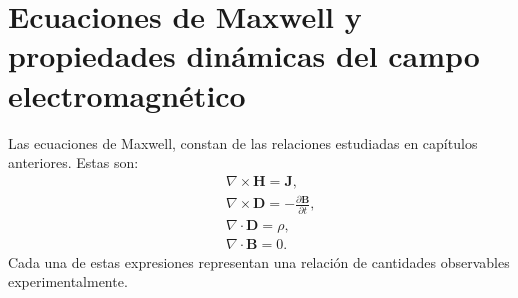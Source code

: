 \documentclass[11pt,fleqn]{book} %
\begin{document}

\pagestyle{empty} %
\tableofcontents %
\cleardoublepage %

\pagestyle{fancy} %


\chapter{Ecuaciones de Maxwell y propiedades din\'amicas del campo electromagn\'etico}

Las ecuaciones de Maxwell, constan de las relaciones estudiadas en cap\'itulos anteriores. Estas son:
\begin{eqnarray}
&&\nabla \times \textbf{H}=\textbf{J}, \nonumber\\
&&\nabla \times \textbf{D}=-\frac{\partial \textbf{B}}{\partial t}, \\
&&\nabla \cdot \textbf{D}=\rho, \nonumber\\
&&\nabla \cdot \textbf{B}=0.\nonumber
\end{eqnarray} \label{Ec Maxwel}
Cada una de estas expresiones representan una relaci\'on de cantidades observables experimentalmente.


\end{document}
